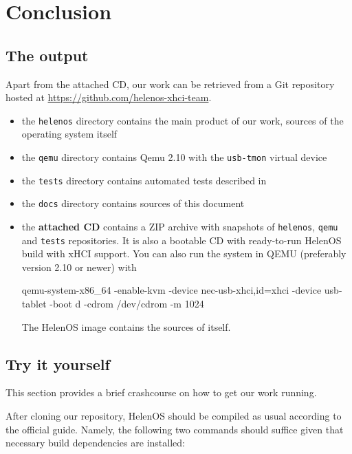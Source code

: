 \chapter*{Conclusion}


\section{The output} %

Apart from the attached CD, our work can be retrieved from a Git repository
hosted at \href{https://github.com/helenos-xhci-team}{https://github.com/helenos-xhci-team}.

\begin{itemize}
\item the \texttt{helenos} directory contains the main product of our work,
sources of the operating system itself
\item the \texttt{qemu} directory contains Qemu 2.10 with the \texttt{usb-tmon} virtual device
\item the \texttt{tests} directory contains automated tests described in 
\item the \texttt{docs} directory contains sources of this document
\item the \textbf{attached CD} contains a ZIP archive with snapshots of \texttt{helenos},
\texttt{qemu} and \texttt{tests} repositories. It is also a bootable CD with
ready-to-run HelenOS build with xHCI support. You can also run the system in
QEMU (preferably version 2.10 or newer) with
\begin{bdsh}
qemu-system-x86_64 -enable-kvm -device nec-usb-xhci,id=xhci -device usb-tablet -boot d -cdrom /dev/cdrom -m 1024
\end{bdsh}
The HelenOS image contains the sources of itself.
\end{itemize}


\section{Try it yourself}

This section provides a brief crashcourse on how to get our work running.

After cloning our repository, HelenOS should be compiled as usual according to
the official guide. Namely, the following two commands should suffice given
that necessary build dependencies are installed:

